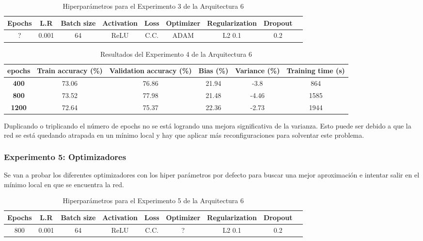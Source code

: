 \documentclass{article}
\begin{document}
        \begin{table}[!h]
				\begin{tabular}{|c|c|c|c|c|c|c|c|c|}
					\textbf{Epochs}&\textbf{L.R}&\textbf{Batch size}&\textbf{Activation}&\textbf{Loss}&\textbf{Optimizer}&\textbf{Regularization}&\textbf{Dropout}   \\ \hline
					? & 0.001 & 64 & ReLU & C.C. & ADAM & L2 0.1 & 0.2 
				\end{tabular}
				\caption{Hiperpar\'ametros para el Experimento 3 de la Arquitectura 6}
				\label{tab:hip-a6-e2}
			\end{table}

    
   
   \begin{table}[!h]
				\begin{center}
					\begin{tabular}{ c | c | c | c | c | c |}
						 \textbf{epochs} & \textbf{Train accuracy (\%)} & \textbf{Validation accuracy (\%)} & \textbf{Bias (\%)} & \textbf{Variance (\%)} & \textbf{Training time (s)} \\ \hline
						\textbf{400 } & 73.06   & 76.86 &  21.94 & -3.8 &864   \\ \hline
                        \textbf{800 } & 73.52   &77.98 &  21.48 & -4.46  &1585    \\ \hline
                        \textbf{1200} &  72.64  &75.37  &  22.36& -2.73 &1944    \\ \hline
					\end{tabular}
					\caption{Resultados del Experimento 4 de la Arquitectura 6}
					\label{tab:res-a2-e5}
				\end{center}
			\end{table}

Duplicando o triplicando el n\'umero de epochs no se est\'a logrando una mejora significativa de la varianza. Esto puede ser debido a que la red se est\'a quedando atrapada en un m\'inimo local y hay que aplicar más reconfiguraciones para solventar este problema. 
		\subsubsection{Experimento 5: Optimizadores}
Se van a probar los diferentes optimizadores con los hiper par\'ametros por defecto para buscar una mejor aproximaci\'on e intentar salir en el m\'inimo local en que se encuentra la red. 

 \begin{table}[!h]
				\begin{tabular}{|c|c|c|c|c|c|c|c|c|}
					\textbf{Epochs}&\textbf{L.R}&\textbf{Batch size}&\textbf{Activation}&\textbf{Loss}&\textbf{Optimizer}&\textbf{Regularization}&\textbf{Dropout}   \\ \hline
					800 & 0.001 & 64 & ReLU & C.C. & ? & L2 0.1 & 0.2 
				\end{tabular}
				\caption{Hiperpar\'ametros para el Experimento 5 de la Arquitectura 6}
				\label{tab:hip-a6-e2}
			\end{table}
\end{document}

